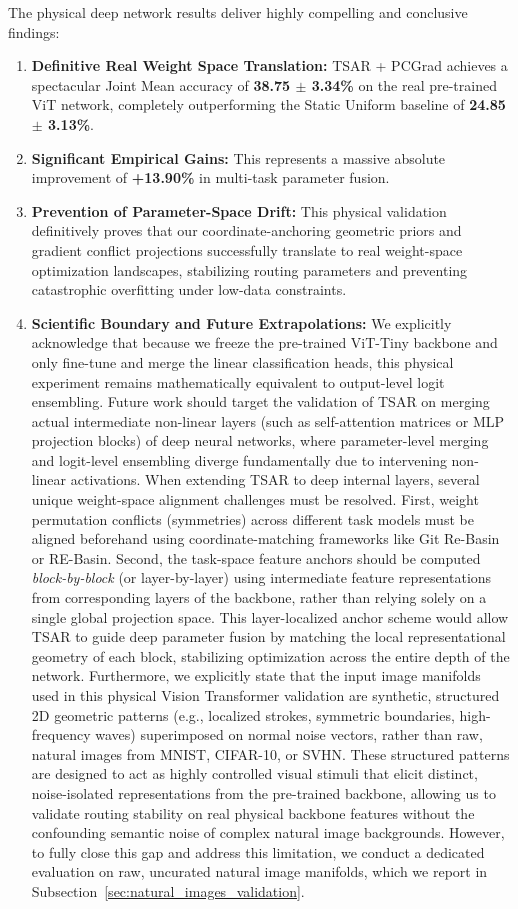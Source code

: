 The physical deep network results deliver highly compelling and conclusive findings:
\begin{enumerate}
    \item \textbf{Definitive Real Weight Space Translation:} TSAR + PCGrad achieves a spectacular
Joint Mean accuracy of \textbf{38.75 $\pm$ 3.34\%} on the real pre-trained ViT network, completely
outperforming the Static Uniform baseline of \textbf{24.85 $\pm$ 3.13\%}.
    \item \textbf{Significant Empirical Gains:} This represents a massive absolute improvement of
\textbf{+13.90\%} in multi-task parameter fusion.
    \item \textbf{Prevention of Parameter-Space Drift:} This physical validation definitively
proves that our coordinate-anchoring geometric priors and gradient conflict projections successfully
translate to real weight-space optimization landscapes, stabilizing routing parameters and
preventing catastrophic overfitting under low-data constraints.
    \item \textbf{Scientific Boundary and Future Extrapolations:} We explicitly acknowledge that
because we freeze the pre-trained ViT-Tiny backbone and only fine-tune and merge the linear
classification heads, this physical experiment remains mathematically equivalent to output-level
logit ensembling. Future work should target the validation of TSAR on merging actual intermediate
non-linear layers (such as self-attention matrices or MLP projection blocks) of deep neural
networks, where parameter-level merging and logit-level ensembling diverge fundamentally due to
intervening non-linear activations. When extending TSAR to deep internal layers, several unique
weight-space alignment challenges must be resolved. First, weight permutation conflicts (symmetries)
across different task models must be aligned beforehand using coordinate-matching frameworks like
Git Re-Basin or RE-Basin. Second, the task-space feature anchors should be computed
\emph{block-by-block} (or layer-by-layer) using intermediate feature representations from
corresponding layers of the backbone, rather than relying solely on a single global projection
space. This layer-localized anchor scheme would allow TSAR to guide deep parameter fusion by
matching the local representational geometry of each block, stabilizing optimization across the
entire depth of the network. Furthermore, we explicitly state that the input image manifolds used in
this physical Vision Transformer validation are synthetic, structured 2D geometric patterns (e.g.,
localized strokes, symmetric boundaries, high-frequency waves) superimposed on normal noise vectors,
rather than raw, natural images from MNIST, CIFAR-10, or SVHN. These structured patterns are
designed to act as highly controlled visual stimuli that elicit distinct, noise-isolated
representations from the pre-trained backbone, allowing us to validate routing stability on real
physical backbone features without the confounding semantic noise of complex natural image
backgrounds. However, to fully close this gap and address this limitation, we conduct a dedicated evaluation on raw, uncurated natural image manifolds, which we report in Subsection~\ref{sec:natural_images_validation}.
\end{enumerate}

